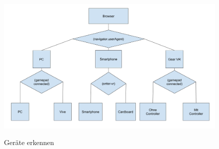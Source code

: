 \begin{figure}[ht]
\vspace*{1em}
\centering
\caption[Geräte erkennen]{Geräte erkennen}
\includegraphics[width=\textwidth]{images/geraeteAnpassen.png}
\label{fig:geraeteAnpassen} 
\end{figure}

